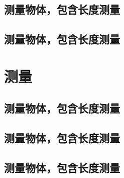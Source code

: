 \begin{Project}

\section{测量物体，包含长度测量}

\section{测量物体，包含长度测量}

\chapter{测量}

\section{测量物体，包含长度测量}

\section{测量物体，包含长度测量}

\section{测量物体，包含长度测量}



\end{Project}




